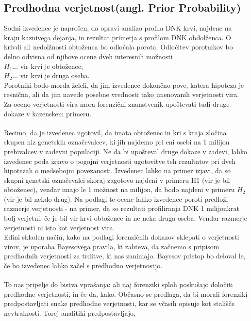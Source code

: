 \documentclass[12pt,a4paper]{amsart}
\theoremstyle{definition} %
\theoremstyle{plain} %
\begin{document}
\subsection{Predhodna verjetnost(angl. Prior Probability)}
Sodni izvedenec je naprošen, da opravi analizo profila DNK krvi, najdene na kraju kaznivega dejanja, in rezultat primerja s profilom DNK 
obdolženca. O krivdi ali nedolžnosti obtoženca bo odločala porota. Odločitev porotnikov bo delno odvisna od njihove ocene dveh interesnih 
možnosti\\
$H_1 \dots$ vir krvi je obtoženec,\\
$H_2 \dots$ vir krvi je druga oseba.\\
Porotniki bodo morda želeli, da jim izvedenec dokončno pove, katera hipoteza je resnična, ali da jim navede posebne vrednosti tako imenovanih 
verjetnosti vira. Za oceno verjetnosti vira mora forenzični znanstvenik upoštevati tudi druge dokaze v kazenskem primeru.\\\\
Recimo, da je izvedenec ugotovil, da imata obtoženec in kri s kraja zločina skupen niz genetskih označevalcev, ki jih najdemo pri eni osebi 
na 1 milijon prebivalcev v zadevni populaciji. Ne da bi upošteval druge dokaze v zadevi, lahko izvedenec poda izjavo o pogojni verjetnosti 
ugotovitve teh rezultatov pri dveh hipotezah o medsebojni povezanosti. Izvedenec lahko na primer izjavi, da so skupni genetski označevalci 
skoraj zagotovo najdeni v primeru H1 (vir je bil obtoženec), vendar imajo le 1 možnost na milijon, da bodo najdeni v primeru $H_2$ (vir je bil 
nekdo drug). Na podlagi te ocene lahko izvedenec poroti predloži razmerje verjetnosti - na primer, da so rezultati profiliranja DNK 1 milijonkrat 
bolj verjetni, če je bil vir krvi obtoženec in ne neka druga oseba. Vendar razmerje verjetnosti ni isto kot verjetnost vira. \\
Edini skladen način, kako na podlagi forenzičnih dokazov sklepati o verjetnosti virov, je uporaba Bayesovega pravila, ki zahteva, da začnemo s 
pripisom predhodnih verjetnosti za trditve, ki nas zanimajo. Bayesov pristop bo deloval le, če bo izvedenec lahko začel s predhodno verjetnostjo.\\\\
To nas pripelje do bistva vprašanja: ali naj forenziki sploh poskušajo določiti predhodne verjetnosti, in če da, kako. Občasno se predlaga, da 
bi morali forenziki predpostavljati enake predhodne verjetnosti, kar se včasih opisuje kot stališče nevtralnosti. Torej analitiki predpostavljajo, 
\end{document}
